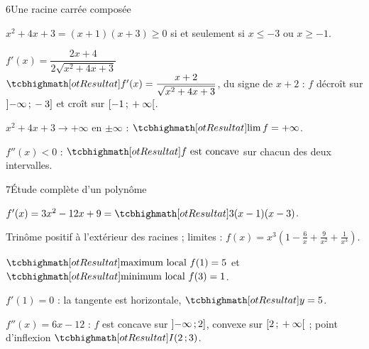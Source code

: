 \begin{deuxcolonnes}
\begin{corrige}{6}{Une racine carrée composée}
\begin{questions}
  \item $x^{2}+4x+3=(x+1)(x+3)\geq0$ si et seulement si $x\leq-3$ ou $x\geq-1$.
  \item $f'(x)=\dfrac{2x+4}{2\sqrt{x^{2}+4x+3}}$\\[1mm]
    $\res{f'(x)=\dfrac{x+2}{\sqrt{x^{2}+4x+3}}}$, du signe de $x+2$ :
    $f$ décroît sur $\mathopen{]}-\infty\,{;}\,-3\mathclose{]}$ et croît sur $\mathopen{[}-1\,{;}\,+\infty\mathclose{[}$.
  \item $x^{2}+4x+3\to+\infty$ en $\pm\infty$ : $\res{\lim f=+\infty}$.
  \item $f''(x)<0$ : $\res{f\text{ est concave}}$ sur chacun des deux intervalles.
\end{questions}
\end{corrige}

\end{deuxcolonnes}

\begin{corrige}{7}{Étude complète d'un polynôme}
\noindent
\begin{minipage}[t]{0.47\linewidth}\vspace{0pt}\raggedright
\begin{questions}
  \item $f'(x)=3x^{2}-12x+9=\res{3(x-1)(x-3)}$.
  \item Trinôme positif à l'extérieur des racines ; limites : $f(x)=x^{3}\left(1-\frac6x+\frac{9}{x^{2}}+\frac{1}{x^{3}}\right)$.
  \item $\res{\text{maximum local }f(1)=5}$ et $\res{\text{minimum local }f(3)=1}$.
  \item $f'(1)=0$ : la tangente est horizontale, $\res{y=5}$.
  \item $f''(x)=6x-12$ : $f$ est concave sur $\mathopen{]}-\infty\,{;}\,2\mathclose{]}$, convexe sur $\mathopen{[}2\,{;}\,+\infty\mathclose{[}$ ;
    point d'inflexion $\res{I(2\pv3)}$.
\end{questions}
\end{minipage}\hfill
\begin{minipage}[t]{0.5\linewidth}\vspace{2mm}
\centering
\begin{tableau}
\end{tableau}
\end{minipage}
\end{corrige}

